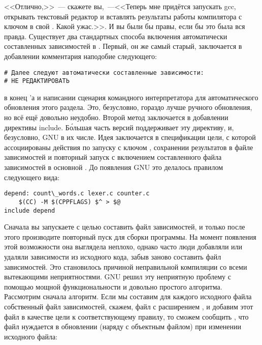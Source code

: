 <<Отлично,>>~--- скажете вы,~---<<Теперь мне придётся запускать gcc,
открывать текстовый редактор и вставлять результаты работы компилятора
с ключом  в свой \Makefile{}. Какой ужас.>>. И вы были бы
правы, если бы это была вся правда. Существует два стандартных способа
включения автоматически составленных зависимостей в \Makefile{}.
Первый, он же самый старый, заключается в добавлении комментария
наподобие следующего:

{\footnotesize
\begin{verbatim}
# Далее следуют автоматически составленные зависимости:
# НЕ РЕДАКТИРОВАТЬ
\end{verbatim}
}

{\flushleft
в конец \Makefile{}'а и написании сценария командного интерпретатора
для автоматического обновления этого раздела. Это, безусловно, гораздо
лучше ручного обновления, но всё ещё довольно неудобно. Второй метод
заключается в добавлении директивы include. Б\'{о}льшая часть версий
\GNUmake{} поддерживает эту директиву, и, безусловно, GNU \GNUmake{} в
их числе. Идея заключается в спецификации цели, с которой
ассоциированы действия по запуску  с ключом ,
сохранении результатов в файле зависимостей и повторный запуск
\GNUmake{} с включением составленного файла зависимостей в основной
\Makefile{}. До появления GNU \GNUmake{} это делалось правилом
следующего вида:
}

{\footnotesize
\begin{verbatim}
depend: count\_words.c lexer.c counter.c
    $(CC) -M $(CPPFLAGS) $^ > $@
include depend
\end{verbatim}
}

Сначала вы запускаете \GNUmake{} с целью составить файл зависимостей,
и только после этого производите повторный пуск для сборки программы.
На момент появления этой возможности она выглядела неплохо, однако
часто люди добавляли или удаляли зависимости из исходного кода, забыв
заново составить файл зависимостей. Это становилось причиной
неправильной компиляции со всеми вытекающими неприятностями. GNU
\GNUmake{} решил эту неприятную проблему с помощью мощной
функциональности и довольно простого алгоритма. Рассмотрим сначала
алгоритм. Если мы составим для каждого исходного файла собственный
файл зависимостей, скажем, файл с расширением , и добавим
этот файл в качестве цели к соответствующему правилу, то сможем
сообщить \GNUmake{}, что  файл нуждается в обновлении
(наряду с объектным файлом) при изменении исходного файла:

